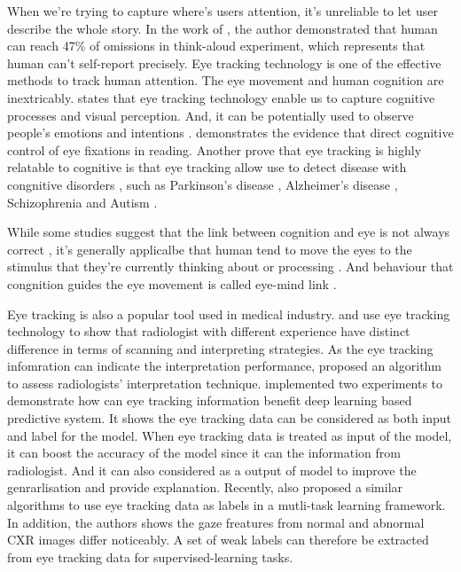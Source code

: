 When we're trying to capture where's users attention, it's unreliable to let user describe the whole story. In the work of \citet{Guan2006ThinkAloud}, the author demonstrated that human can reach 47\% of omissions in think-aloud experiment, which represents that human can't self-report precisely. Eye tracking technology is one of the effective methods to track human attention. The eye movement and human cognition are inextricably. \citet{Schall2014EyeTrackingIntro} states that eye tracking technology enable us to capture cognitive processes and visual perception. And, it can be potentially used to observe people's emotions and intentions \citep{Harezlak2018EyeTrackingInMedicine}. \citet{Rayner2015EvidenceCongnitiveFixation} demonstrates the evidence that direct cognitive control of eye fixations in reading. Another prove that eye tracking is highly relatable to cognitive is that eye tracking allow use to detect disease with congnitive disorders \citep{Harezlak2018EyeTrackingInMedicine}, such as Parkinson's disease \citep{S2016Parkinson}, Alzheimer's disease \citep{Crawford2015Alzheimer},
Schizophrenia \citep{Levy2010Schizophrenia} and Autism \citep{Belen2021Autism}.

While some studies suggest that the link between cognition and eye is not always correct \citep{Anderson2004EyeMovementNegativeSupport, Schall2014EyeTrackingIntro}, it's generally applicalbe that human tend to move the eyes to the stimulus that they're currently thinking about or processing \citep{Cater2020BestPracticeEyeTracking}. And behaviour that congnition guides the eye movement is called eye-mind link \citep{Reichle2012EyeMindLink1, Reichle2010EyeMindLink2}.

Eye tracking is also a popular tool used in medical industry. \citet{Manning2003ExpreienceRadiologist} and \citet{Nicholas2015PassingGlance} use eye tracking technology to show that radiologist with different experience have distinct difference in terms of scanning and interpreting strategies. As the eye tracking infomration can indicate the interpretation performance, \citep{McLaughlin2017EvaluateRadiologistPeformanceLevel} proposed an algorithm to assess radiologists' interpretation technique. \citet{Karargyris2021EyeGazePaper} implemented two experiments to demonstrate how can eye tracking information benefit deep learning based predictive system. It shows the eye tracking data can be considered as both input and label for the model. When eye tracking data is treated as input of the model, it can boost the accuracy of the model since it can the information from radiologist. And it can also considered as a output of model to improve the genrarlisation and provide explanation. Recently, \citep{Saab2021EyeTrackingCXRClassification} also proposed a similar algorithms to use eye tracking data as labels in a mutli-task learning framework. In addition, the authors shows the gaze freatures from normal and abnormal CXR images differ noticeably. A set of weak labels can therefore be extracted from eye tracking data for supervised-learning tasks.


